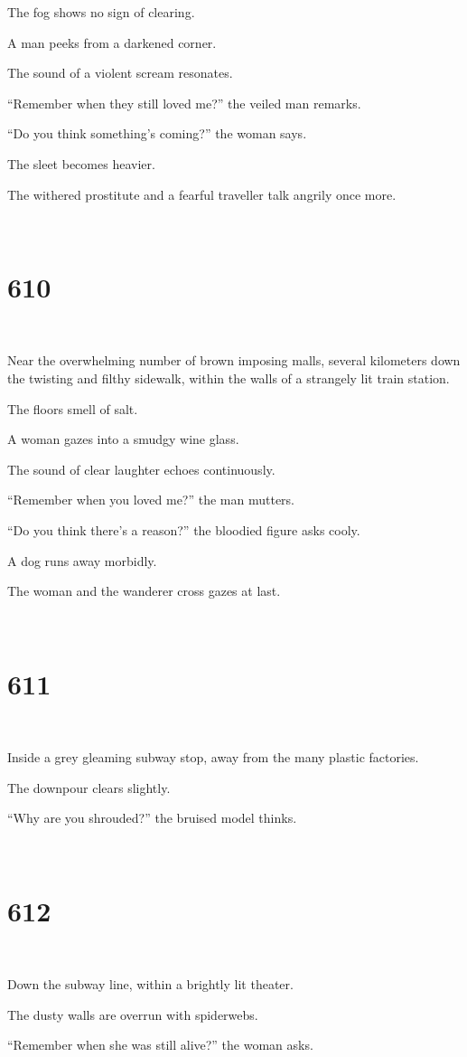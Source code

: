 \documentclass{report}
\begin{document}
The fog shows no sign of clearing.

A man peeks from a darkened corner.

The sound of a violent scream resonates.

``Remember when they still loved me?'' the veiled man remarks.

``Do you think something's coming?'' the woman says.

The sleet becomes heavier.

The withered prostitute and a fearful traveller talk angrily once more.

~
\chapter*{610}
~

Near the overwhelming number of brown imposing malls, several kilometers down the twisting and filthy sidewalk, within the walls of a strangely lit train station.

The floors smell of salt.

A woman gazes into a smudgy wine glass.

The sound of clear laughter echoes continuously.

``Remember when you loved me?'' the man mutters.

``Do you think there's a reason?'' the bloodied figure asks cooly.

A dog runs away morbidly.

The woman and the wanderer cross gazes at last.

~
\chapter*{611}
~

Inside a grey gleaming subway stop, away from the many plastic factories.

The downpour clears slightly.

``Why are you shrouded?'' the bruised model thinks.

~
\chapter*{612}
~

Down the subway line, within a brightly lit theater.

The dusty walls are overrun with spiderwebs.

``Remember when she was still alive?'' the woman asks.
\end{document}
